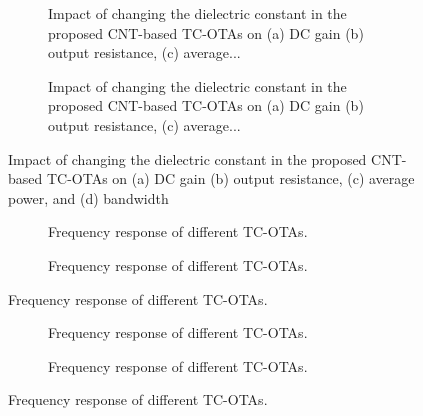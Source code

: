 \begin{figure}[htbp]
  \centering
  \begin{subfigure}[b]{0.48\linewidth}
    \centering
    \caption{Impact of changing the dielectric constant in the proposed CNT-based TC-OTAs on (a) DC gain (b) output resistance, (c) average...}

  \end{subfigure}
  \hfill
  \begin{subfigure}[b]{0.48\linewidth}
    \centering
    \caption{Impact of changing the dielectric constant in the proposed CNT-based TC-OTAs on (a) DC gain (b) output resistance, (c) average...}

  \end{subfigure}
  \caption{Impact of changing the dielectric constant in the proposed CNT-based TC-OTAs on (a) DC gain (b) output resistance, (c) average power, and (d) bandwidth}

  \label{fig:group_r9a9f}
\end{figure}

\begin{figure}[htbp]
  \centering
  \begin{subfigure}[b]{0.48\linewidth}
    \centering
    \caption{Frequency response of different TC-OTAs.}

  \end{subfigure}
  \hfill
  \begin{subfigure}[b]{0.48\linewidth}
    \centering
    \caption{Frequency response of different TC-OTAs.}

  \end{subfigure}
  \caption{Frequency response of different TC-OTAs.}

  \label{fig:group_ieujb}
\end{figure}

\begin{figure}[htbp]
  \centering
  \begin{subfigure}[b]{0.48\linewidth}
    \centering
    \caption{Frequency response of different TC-OTAs.}

  \end{subfigure}
  \hfill
  \begin{subfigure}[b]{0.48\linewidth}
    \centering
    \caption{Frequency response of different TC-OTAs.}

  \end{subfigure}
  \caption{Frequency response of different TC-OTAs.}

  \label{fig:group_ncpui}
\end{figure}

